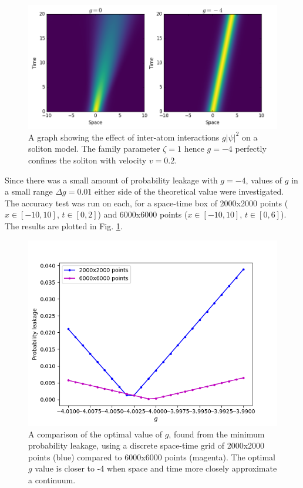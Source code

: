 \documentclass[10pt, twocolumn]{revtex4}    %
\begin{document}
\begin{figure}[h]
\includegraphics[width=\columnwidth]{milestonepic.png}
\caption{A graph showing the effect of inter-atom interactions $g |\psi|^2$ on a soliton model. The family 
parameter $\zeta = 1$ hence $g=-4$ perfectly confines the soliton with velocity $v=0.2$.}
\end{figure}

Since there was a small amount of probability leakage with $g=-4$, values of $g$ in a small range $\Delta g = 0.01$ either side of the theoretical value were investigated. The accuracy test was run on each, for a space-time box of 2000x2000 points ($x \in [-10,10]$, $t \in [0,2]$) and 6000x6000 points ($x \in [-10,10]$, $t \in [0,6]$). The results are plotted in Fig. \ref{errorsfig}. 

\begin{figure}[h] 
\includegraphics[width=\columnwidth]{errors.png}
\caption{A comparison of the optimal value of $g$, found from the minimum probability leakage, using a discrete space-time grid of 2000x2000 points (blue) compared to 6000x6000 points (magenta). The optimal $g$ value is closer to -4 when space and time more closely approximate a continuum.}
\label{errorsfig}
\end{figure}
\end{document}
